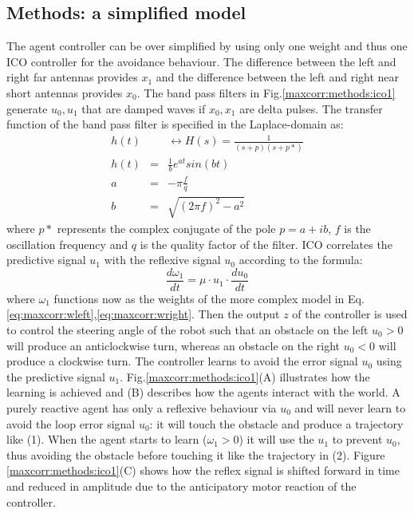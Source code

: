 \subsection{Methods: a simplified model}
The agent controller can be over simplified by using only one weight and thus one
ICO controller for the avoidance behaviour.
The difference between the left and right far antennas provides $x_{1}$ and the
difference between the left and right near short antennas provides $x_0$.
The band pass filters in Fig.\ref{maxcorr:methods:ico1} generate $u_{0},u_{1}$
that are damped waves if $x_0,x_1$ are delta pulses.
The transfer function of the band pass filter is specified in the Laplace-domain as:
\begin{eqnarray}
h(t)& &\leftrightarrow H(s) =\frac{1}{(s+p)(s+p*)}\\
h(t)&=&\frac{1}{b}e^{at}sin(bt)\\
a &=&-\pi \frac{f}{q}\\
b &=&\sqrt{(2\pi f)^2 -a^{2}}
\end{eqnarray}
where $p*$ represents the complex conjugate of the pole $p = a + ib$, $f$ is the
oscillation frequency and $q$ is the quality factor of the filter.
ICO correlates the predictive signal $u_{1}$ with the reflexive signal $u_{0}$
according to the formula:
\begin{equation}
 \frac{d\omega_1}{dt}=\mu \cdot u_1 \cdot \frac{du_0}{dt}
\end{equation}
where $\omega_1$ functions now as the weights of the more complex model in Eq. \ref{eq:maxcorr:wleft},\ref{eq:maxcorr:wright}.
Then the output $z$ of the controller is used to control the steering angle of
the robot such that an obstacle on the left $u_0>0$ will produce an anticlockwise turn,
whereas an obstacle on the right $u_0<0$ will produce a clockwise turn.
The controller learns to avoid the error signal $u_{0}$ using the predictive
signal $u_{1}$. Fig.\ref{maxcorr:methods:ico1}(A) illustrates how the learning
is achieved and (B) describes how the agents interact with the world.
A purely reactive agent has only a reflexive behaviour via $u_0$ and will never
learn to avoid the loop error signal $u_{0}$: it will touch the obstacle and
produce a trajectory like (1). When the agent starts to learn ($\omega_{1}>0$)
it will use the $u_{1}$ to prevent $u_0$, thus avoiding the obstacle before touching
it like the trajectory in (2).
Figure \ref{maxcorr:methods:ico1}(C) shows how the reflex signal is shifted forward
in time and reduced in amplitude due to the anticipatory motor reaction of the controller.
